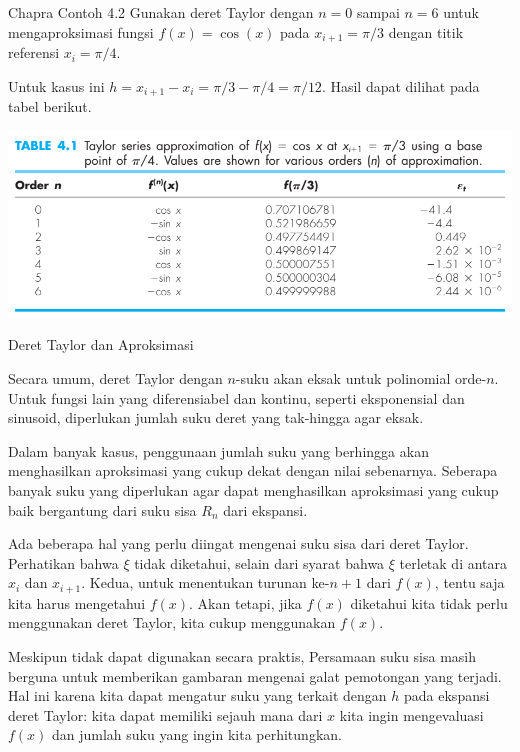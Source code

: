 \begin{frame}
\fontsize{9}{10}\selectfont

\begin{block}{Chapra Contoh 4.2}
Gunakan deret Taylor dengan $n=0$ sampai $n=6$ untuk mengaproksimasi
fungsi $f(x) = \cos(x)$ pada $x_{i+1} = \pi/3$ dengan titik referensi
$x_{i} = \pi/4$.
\end{block}

Untuk kasus ini $h=x_{i+1} - x_{i} = \pi/3 - \pi/4 = \pi/12$.
Hasil dapat dilihat pada tabel berikut.

{\centering
\includegraphics[height=0.5\textheight]{../chapra_7th/Chapra_Table_Example_4_2.png}
\par}

\end{frame}


\begin{frame}{Deret Taylor dan Aproksimasi}
\fontsize{9}{10}\selectfont

Secara umum, deret Taylor dengan $n$-suku akan eksak untuk polinomial
orde-$n$. Untuk fungsi lain yang diferensiabel dan kontinu, seperti eksponensial
dan sinusoid, diperlukan jumlah suku deret yang tak-hingga agar eksak.

Dalam banyak kasus, penggunaan jumlah suku yang berhingga akan menghasilkan
aproksimasi yang cukup dekat dengan nilai sebenarnya. Seberapa banyak suku
yang diperlukan agar dapat menghasilkan aproksimasi yang cukup baik bergantung
dari suku sisa $R_{n}$ dari ekspansi.

Ada beberapa hal yang perlu diingat mengenai suku sisa dari deret Taylor.
Perhatikan bahwa $\xi$ tidak diketahui, selain dari syarat bahwa $\xi$ terletak
di antara $x_{i}$ dan $x_{i+1}$. Kedua, untuk menentukan turunan ke-$n+1$ dari
$f(x)$, tentu saja kita harus mengetahui $f(x)$. Akan tetapi, jika $f(x)$ diketahui
kita tidak perlu menggunakan deret Taylor, kita cukup menggunakan $f(x)$.

Meskipun tidak dapat digunakan secara praktis, Persamaan suku sisa masih
berguna untuk memberikan gambaran mengenai galat pemotongan yang terjadi.
Hal ini karena kita dapat mengatur suku yang terkait dengan $h$ pada ekspansi
deret Taylor: kita dapat memiliki sejauh mana dari $x$ kita ingin mengevaluasi $f(x)$
dan jumlah suku yang ingin kita perhitungkan.
\end{frame}



